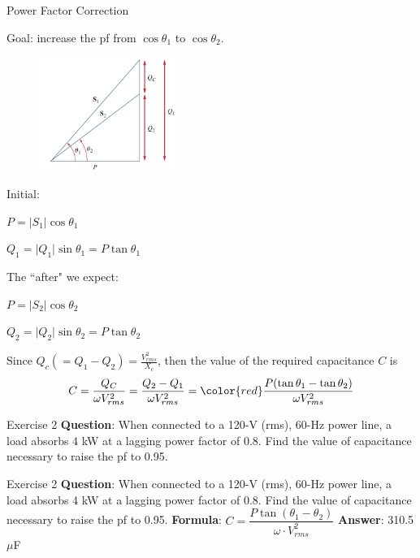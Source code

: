 \documentclass{beamer}
\begin{document}
\begin{frame}{Power Factor Correction}

Goal: increase the pf from $\cos \theta_1$ to $\cos \theta_2$.
\begin{multicols}{2}
\sectiont{}
\begin{figure}
    \centering
    \includegraphics[width=0.4\textwidth]{img_ch11/triangle2.png}
\end{figure}
\sectiont{}
Initial:

$P = \vert S_1\vert \cos \theta_1$

$Q_1 = \vert Q_1\vert \sin \theta_1= P \tan \theta_1$

\vspace{0.3cm}
The ``after" we expect:

$P = \vert S_2\vert \cos \theta_2$

$Q_2 = \vert Q_2\vert \sin \theta_2= P \tan \theta_2$
        
\end{multicols}

Since $Q_c(=Q_1-Q_2)= \frac{V_{rms}^2}{X_c}$, then the value of the required capacitance $C$ is 
$$C = \frac{Q_C}{\omega V_{rms}^2} = \frac{Q_2-Q_1}{\omega V_{rms}^2} = \color{red}\frac{P(\tan \theta_1 - \tan \theta_2)}{\omega V_{rms}^2}$$
\end{frame}


\begin{frame}{Exercise 2}
\textbf{Question}:
\newline
When connected to a 120-V (rms), 60-Hz power line, a load absorbs 4 kW at a lagging power factor of 0.8. Find the value of capacitance necessary to raise the pf to 0.95.
\end{frame}

\begin{frame}{Exercise 2}
\textbf{Question}:
\newline
When connected to a 120-V (rms), 60-Hz power line, a load absorbs 4 kW at a lagging power factor of 0.8. Find the value of capacitance necessary to raise the pf to 0.95.
\newline
\newline
\textbf{Formula}: $C=\dfrac{P  \tan(\theta_{1}-\theta_{2})}{\omega \cdot V_{rms}^{2}}$
\newline
\newline
\textbf{Answer}: 310.5 $\mu$F
\end{frame}
\end{document}
